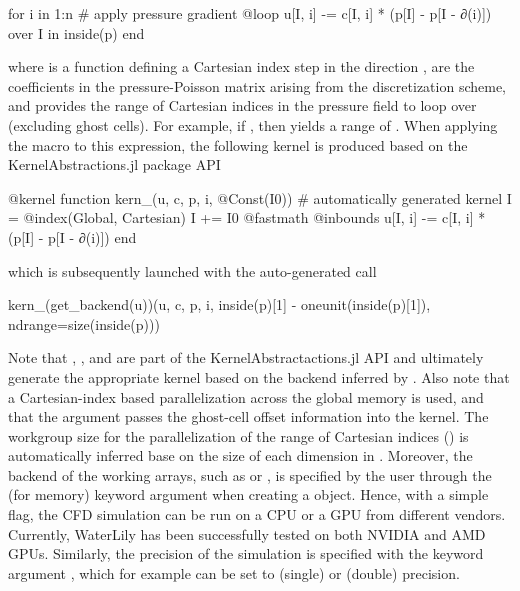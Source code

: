 \documentclass[10pt,a4paper]{article}
\begin{document}
\begin{minipage}{\linewidth}
\begin{jllisting}
for i in 1:n  # apply pressure gradient
    @loop u[I, i] -= c[I, i] * (p[I] - p[I - ∂(i)]) over I in inside(p)
end
\end{jllisting}
\end{minipage}

where  is a function defining a Cartesian index step in the direction ,  are the coefficients in the pressure-Poisson matrix arising from the discretization scheme, and  provides the range of Cartesian indices  in the pressure field to loop over (excluding ghost cells). For example, if , then  yields a range of . When applying the  macro to this expression, the following kernel is produced based on the KernelAbstractions.jl package API \citep{Churavy2023}

\begin{minipage}{\linewidth}
\begin{jllisting}
@kernel function kern_(u, c, p, i, @Const(I0)) # automatically generated kernel
    I = @index(Global, Cartesian)
    I += I0
    @fastmath @inbounds u[I, i] -= c[I, i] * (p[I] - p[I - ∂(i)])
end
\end{jllisting}
\end{minipage}

which is subsequently launched with the auto-generated call

\begin{minipage}{\linewidth}
\begin{jllisting}
kern_(get_backend(u))(u, c, p, i, inside(p)[1] - oneunit(inside(p)[1]), ndrange=size(inside(p)))
\end{jllisting}
\end{minipage}

Note that , ,  and  are part of the KernelAbstractactions.jl API and ultimately generate the appropriate kernel based on the backend inferred by . Also note that a Cartesian-index based parallelization across the global memory is used, and that the  argument passes the ghost-cell offset information into the kernel. The workgroup size for the parallelization of the range of Cartesian indices () is automatically inferred base on the size of each dimension in . Moreover, the backend of the working arrays, such as  or , is specified by the user through the  (for memory) keyword argument when creating a  object. Hence, with a simple flag, the CFD simulation can be run on a CPU or a GPU from different vendors. Currently, WaterLily has been successfully tested on both NVIDIA and AMD GPUs. Similarly, the precision of the simulation is specified with the keyword argument , which for example can be set to  (single) or  (double) precision.
\end{document}
